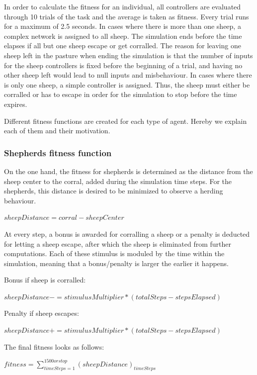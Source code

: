 \documentclass[conference]{IEEEtran}
\begin{document}
In order to calculate the fitness for an individual, all controllers are evaluated through 10 trials of the task and the average is taken as fitness.
Every trial runs for a maximum of 2.5 seconds. In cases where there is more than one sheep, a complex network is assigned to all sheep. The simulation ends before the time elapses if all but one sheep escape or get corralled. The reason for leaving one sheep left in the pasture when ending the simulation is that the number of inputs for the sheep controllers is fixed before the beginning of a trial, and having no other sheep left would lead to null inputs and misbehaviour. In cases where there is only one sheep, a simple controller is assigned. Thus, the sheep must either be corralled or has to escape in order for the simulation to stop before the time expires.

Different fitness functions are created for each type of agent. Hereby we explain each of them and their motivation.

\subsubsection{Shepherds fitness function}
On the one hand, the fitness for shepherds is determined as the distance from the sheep center to the corral, added during the simulation time steps. For the shepherds, this distance is desired to be minimized to observe a herding behaviour.  

$\displaystyle sheepDistance = corral - sheepCenter $

At every step, a bonus  is awarded for corralling a sheep or a penalty is deducted for letting a sheep escape, after which the sheep is eliminated from further computations. Each of these stimulus is moduled by the time within the simulation, meaning that a bonus/penalty is larger the earlier it happens. 

Bonus if sheep is corralled:

$\displaystyle sheepDistance -= stimulusMultiplier * (totalSteps - stepsElapsed)$

Penalty if sheep escapes:

$\displaystyle sheepDistance += stimulusMultiplier * (totalSteps - stepsElapsed)$

The final fitness looks as follows: 

$\displaystyle fitness = \sum_{timeSteps=1}^{1500 or stop}(sheepDistance)_{timeSteps}$
\end{document}
